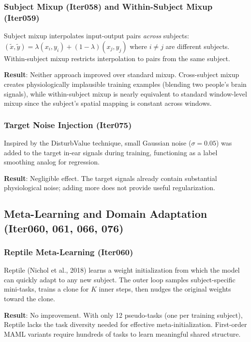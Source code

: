 \documentclass[11pt,a4paper]{article}
\begin{document}
\subsubsection{Subject Mixup (Iter058) and Within-Subject Mixup (Iter059)}

Subject mixup interpolates input-output pairs \emph{across} subjects:
$(\tilde{x}, \tilde{y}) = \lambda (x_i, y_i) + (1-\lambda)(x_j, y_j)$
where $i \neq j$ are different subjects. Within-subject mixup restricts
interpolation to pairs from the same subject.

\textbf{Result}: Neither approach improved over standard mixup. Cross-subject
mixup creates physiologically implausible training examples (blending two
people's brain signals), while within-subject mixup is nearly equivalent
to standard window-level mixup since the subject's spatial mapping is
constant across windows.

\subsubsection{Target Noise Injection (Iter075)}

Inspired by the DisturbValue technique, small Gaussian noise
($\sigma = 0.05$) was added to the target in-ear signals during training,
functioning as a label smoothing analog for regression.

\textbf{Result}: Negligible effect. The target signals already contain
substantial physiological noise; adding more does not provide useful
regularization.

\subsection{Meta-Learning and Domain Adaptation (Iter060, 061, 066, 076)}

\subsubsection{Reptile Meta-Learning (Iter060)}

Reptile (Nichol et al., 2018) learns a weight initialization from which
the model can quickly adapt to any new subject. The outer loop samples
subject-specific mini-tasks, trains a clone for $K$ inner steps, then
nudges the original weights toward the clone.

\textbf{Result}: No improvement. With only 12 pseudo-tasks (one per
training subject), Reptile lacks the task diversity needed for effective
meta-initialization. First-order MAML variants require hundreds of tasks
to learn meaningful shared structure.
\end{document}
